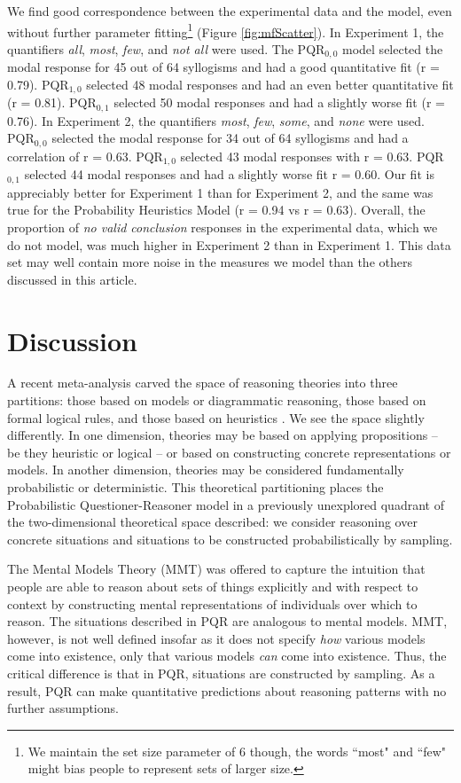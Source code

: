 \documentclass[10pt,letterpaper]{article}
\begin{document}
We find good correspondence between the experimental data and the model, even without further parameter fitting\footnote{We maintain the set size parameter of 6 though, the words ``most" and ``few" might bias people to represent sets of larger size.} (Figure \ref{fig:mfScatter}). In Experiment 1, the quantifiers \emph{all}, \emph{most}, \emph{few}, and \emph{not all} were used. The PQR$_{0,0}$ model selected the modal response for 45 out of 64 syllogisms and had a good quantitative fit (r = 0.79).  PQR$_{1,0}$ selected 48 modal responses and had an even better quantitative fit (r = 0.81). PQR$_{0,1}$ selected 50 modal responses and had a slightly worse fit (r = 0.76). 
%
In Experiment 2, the quantifiers \emph{most}, \emph{few}, \emph{some}, and \emph{none} were used. PQR$_{0,0}$ selected the modal response for 34 out of 64 syllogisms and had a correlation of r = 0.63. PQR$_{1,0}$ selected 43 modal responses with  r = 0.63. PQR$_{0,1}$ selected 44 modal responses and had a slightly worse fit r = 0.60. 
%
Our fit is appreciably better for Experiment 1 than for Experiment 2, and the same was true for the Probability Heuristics Model (r = 0.94 vs r = 0.63). Overall, the proportion of \emph{no valid conclusion} responses in the experimental data, which we do not model, was much higher in Experiment 2 than in Experiment 1. This data set may well contain more noise in the measures we model than the others discussed in this article. 


\section{Discussion}

A recent meta-analysis carved the space of reasoning theories into three partitions: those based on models or diagrammatic reasoning, those based on formal logical rules, and those based on heuristics \cite{Khemlani2012}. We see the space slightly differently. In one dimension, theories may be based on applying propositions -- be they heuristic or logical -- or based on constructing concrete representations or models. In another dimension, theories may be considered fundamentally probabilistic or deterministic. This theoretical partitioning places the Probabilistic Questioner-Reasoner model in a previously unexplored quadrant of the two-dimensional theoretical space described: we consider reasoning over concrete situations and situations to be constructed probabilistically by sampling.

The Mental Models Theory (MMT) was offered to capture the intuition that people are able to reason about sets of things explicitly and with respect to context by constructing mental representations of individuals over which to reason. The situations described in PQR are analogous to mental models. MMT, however, is not well defined insofar as it does not specify \emph{how} various models come into existence, only that various models \emph{can} come into existence. Thus, the critical difference is that in PQR, situations are constructed by sampling. As a result, PQR can make quantitative predictions about reasoning patterns with no further assumptions. 
\end{document}
